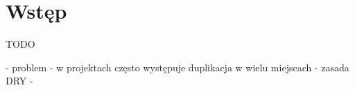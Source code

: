 \chapter{Wstęp} \label{chap:intro}

TODO

- problem
 - w projektach często występuje duplikacja w wielu miejscach
 - zasada DRY
 - 